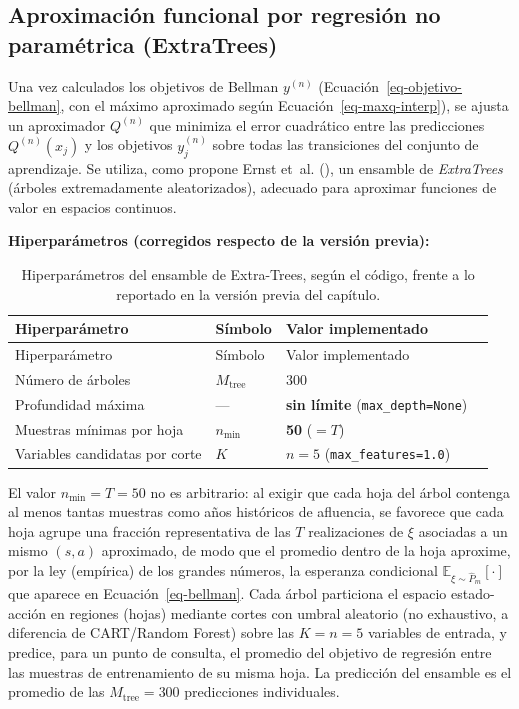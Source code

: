 \documentclass[
  spanish,
  letterpaper,
]{scrreprt}
\theoremstyle{definition}
\theoremstyle{remark}
\begin{document}
\subsection{Aproximación funcional por regresión no paramétrica
(ExtraTrees)}\label{aproximaciuxf3n-funcional-por-regresiuxf3n-no-paramuxe9trica-extratrees}

Una vez calculados los objetivos de Bellman \(y^{(n)}\)
(Ecuación~\ref{eq-objetivo-bellman}, con el máximo aproximado según
Ecuación~\ref{eq-maxq-interp}), se ajusta un aproximador \(Q^{(n)}\) que
minimiza el error cuadrático entre las predicciones \(Q^{(n)}(x_j)\) y
los objetivos \(y^{(n)}_j\) sobre todas las transiciones del conjunto de
aprendizaje. Se utiliza, como propone Ernst et~al.
(), un ensamble de \emph{ExtraTrees}
(árboles extremadamente aleatorizados), adecuado para aproximar
funciones de valor en espacios continuos.

\textbf{Hiperparámetros (corregidos respecto de la versión previa):}

\begin{longtable}[]{@{}llll@{}}
\caption{Hiperparámetros del ensamble de Extra-Trees, según el código,
frente a lo reportado en la versión previa del capítulo.}\tabularnewline
\toprule\noalign{}
Hiperparámetro & Símbolo & Valor implementado & \\
\midrule\noalign{}
\endfirsthead
\toprule\noalign{}
Hiperparámetro & Símbolo & Valor implementado & \\
\midrule\noalign{}
\endhead
\bottomrule\noalign{}
\endlastfoot
Número de árboles & \(M_{\text{tree}}\) & 300 & \\
Profundidad máxima & --- & \textbf{sin límite}
(\texttt{max\_depth=None}) & \\
Muestras mínimas por hoja & \(n_{\min}\) & \textbf{50} (\(=T\)) & \\
Variables candidatas por corte & \(K\) & \(n=5\)
(\texttt{max\_features=1.0}) & \\
\end{longtable}

El valor \(n_{\min}=T=50\) no es arbitrario: al exigir que cada hoja del
árbol contenga al menos tantas muestras como años históricos de
afluencia, se favorece que cada hoja agrupe una fracción representativa
de las \(T\) realizaciones de \(\xi\) asociadas a un mismo \((s,a)\)
aproximado, de modo que el promedio dentro de la hoja aproxime, por la
ley (empírica) de los grandes números, la esperanza condicional
\(\mathbb E_{\xi\sim\widehat P_m}[\cdot]\) que aparece en
Ecuación~\ref{eq-bellman}. Cada árbol particiona el espacio
estado-acción en regiones (hojas) mediante cortes con umbral aleatorio
(no exhaustivo, a diferencia de CART/Random Forest) sobre las \(K=n=5\)
variables de entrada, y predice, para un punto de consulta, el promedio
del objetivo de regresión entre las muestras de entrenamiento de su
misma hoja. La predicción del ensamble es el promedio de las
\(M_{\text{tree}}=300\) predicciones individuales.
\end{document}
